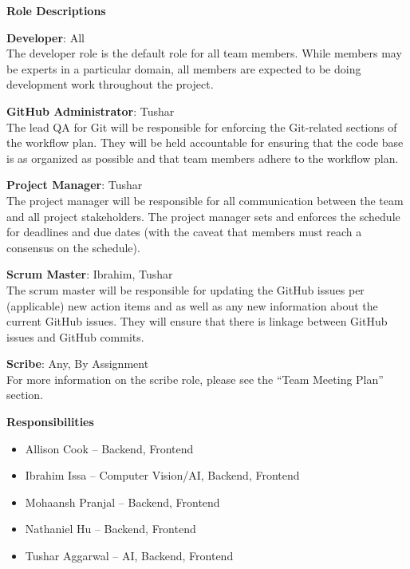 \documentclass{article}
\begin{document}
\noindent \textbf{Role Descriptions}
\begin{itemize}
\begin{item} 
\textbf{Developer}: All \\
The developer role is the default role for all team members. While members may be experts in a particular domain, all members are expected to be doing development work throughout the project.
\end{item}
\begin{item}
\textbf{GitHub Administrator}: Tushar \\
The lead QA for Git will be responsible for enforcing the Git-related sections of the workflow plan. They will be held accountable for ensuring that the code base is as organized as possible and that team members adhere to the workflow plan.
\end{item}
\begin{item}
\textbf{Project Manager}: Tushar \\
The project manager will be responsible for all communication between the team and all project stakeholders. The project manager sets and enforces the schedule for deadlines and due dates (with the caveat that members must reach a consensus on the schedule).
\end{item}
\begin{item}
\textbf{Scrum Master}: Ibrahim, Tushar \\
The scrum master will be responsible for updating the GitHub issues per (applicable) new action items and as well as any new information about the current GitHub issues. They will ensure that there is linkage between GitHub issues and GitHub commits. 
\end{item}
\begin{item} 
\textbf{Scribe}: Any, By Assignment \\
For more information on the scribe role, please see the ``Team Meeting Plan'' section.
\end{item}
\end{itemize}

\noindent \textbf{Responsibilities}
\begin{itemize}
\item Allison Cook – Backend, Frontend 
\item Ibrahim Issa – Computer Vision/AI, Backend, Frontend 
\item Mohaansh Pranjal – Backend, Frontend 
\item Nathaniel Hu – Backend, Frontend 
\item Tushar Aggarwal – AI, Backend, Frontend
\end{itemize}
\end{document}
